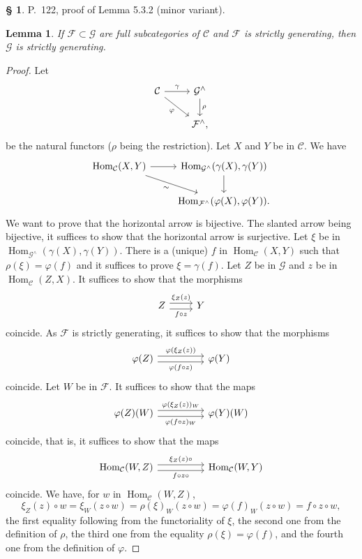 \documentclass[12pt]{article}
\newtheorem{lem}[thm]{Lemma}
\theoremstyle{remark}
\theoremstyle{definition}
\newtheorem{s}[thm]{\S}
\newcommand{\C}{\mathcal C}
\newcommand{\F}{\mathcal F}
\newcommand{\G}{\mathcal G}
\newcommand{\mv}{ (minor variant)}
\DeclareMathOperator{\Hom}{Hom}%
\begin{document}
\begin{s} 
P.~122, proof of Lemma 5.3.2\mv. 
%
\begin{lem} 
If $\F\subset\G$ are full subcategories of $\C$ and $\F$ is strictly generating, then $\G$ is strictly generating. 
\end{lem} 
%
\begin{proof}
Let 
$$
\begin{tikzcd}
\C\ar{r}{\gamma}\ar{dr}[swap]{\varphi}&\G^\wedge\ar{d}{\rho}\\
&\F^\wedge,
\end{tikzcd}
$$ 
be the natural functors ($\rho$ being the restriction). Let $X$ and $Y$ be in $\C$. We have 
$$
\begin{tikzcd}
\Hom_\C(X,Y)\ar{r}\ar{dr}[swap]{\sim}&\Hom_{\G^\wedge}(\gamma(X),\gamma(Y))\ar{d}\\
&\Hom_{\F^\wedge}(\varphi(X),\varphi(Y)). 
\end{tikzcd}
$$ 
We want to prove that the horizontal arrow is bijective. The slanted arrow being bijective, it suffices to show that the horizontal arrow is surjective. Let $\xi$ be in $\Hom_{\G^\wedge}(\gamma(X),\gamma(Y))$. There is a (unique) $f$ in $\Hom_\C(X,Y)$ such that $\rho(\xi)=\varphi(f)$ and it suffices to prove $\xi=\gamma(f)$. Let $Z$ be in $\G$ and $z$ be in $\Hom_\C(Z,X)$. It suffices to show that the morphisms 
$$
\begin{tikzcd}
Z\arrow[yshift=0.7ex]{r}{\xi_Z(z)}\arrow[yshift=-0.7ex]{r}[swap]{f\circ z}&Y
\end{tikzcd}
$$ 
coincide. As $\F$ is strictly generating, it suffices to show that the morphisms 
$$
\begin{tikzcd}
\varphi(Z)\arrow[yshift=0.7ex]{rr}{\varphi(\xi_Z(z))}\arrow[yshift=-0.7ex]{rr}[swap]{\varphi(f\circ z)}&&\varphi(Y)
\end{tikzcd}
$$ 
coincide. Let $W$ be in $\F$. It suffices to show that the maps 
$$
\begin{tikzcd}
\varphi(Z)(W)\arrow[yshift=0.7ex]{rr}{\varphi(\xi_Z(z))_W}\arrow[yshift=-0.7ex]{rr}[swap]{\varphi(f\circ z)_W}&&\varphi(Y)(W)
\end{tikzcd}
$$ 
coincide, that is, it suffices to show that the maps 
$$
\begin{tikzcd}
\Hom_\C(W,Z)\arrow[yshift=0.7ex]{rr}{\xi_Z(z)\circ}\arrow[yshift=-0.7ex]{rr}[swap]{f\circ z\circ}&&\Hom_\C(W,Y)
\end{tikzcd}
$$ 
coincide. We have, for $w$ in $\Hom_\C(W,Z)$,
$$
\xi_Z(z)\circ w=\xi_W(z\circ w)=\rho(\xi)_W(z\circ w)=\varphi(f)_W(z\circ w)
=f\circ z\circ w, 
$$ 
the first equality following from the functoriality of $\xi$, the second one from the definition of $\rho$, the third one from the equality $\rho(\xi)=\varphi(f)$, and the fourth one from the definition of $\varphi$.
\end{proof}
\end{s}
\end{document}
